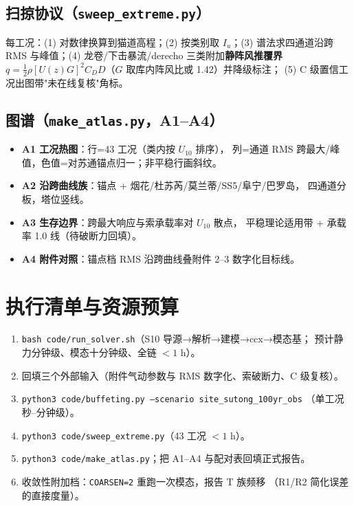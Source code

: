 \documentclass[11pt,a4paper]{ctexart}
\begin{document}
\subsection{扫掠协议（\texttt{sweep\_extreme.py}）}

每工况：(1) 对数律换算到猫道高程；(2) 按类别取 $I_u$；(3) 谱法求四通道沿跨
RMS 与峰值；(4) 龙卷/下击暴流/derecho 三类附加\textbf{静阵风推覆界}
$q=\tfrac12\rho[U(z)G]^2 C_D D$（$G$ 取库内阵风比或 1.42）并降级标注；
(5) C 级置信工况出图带"未在线复核"角标。

\subsection{图谱（\texttt{make\_atlas.py}，A1--A4）}

\begin{itemize}
  \item \textbf{A1 工况热图}：行=43 工况（类内按 $U_{10}$ 排序），
        列=通道 RMS 跨最大/峰值，色值=对苏通锚点归一；非平稳行画斜纹。
  \item \textbf{A2 沿跨曲线族}：锚点 + 烟花/杜苏芮/莫兰蒂/SS5/阜宁/巴罗岛，
        四通道分板，塔位竖线。
  \item \textbf{A3 生存边界}：跨最大响应与索承载率对 $U_{10}$ 散点，
        平稳理论适用带 + 承载率 1.0 线（待破断力回填）。
  \item \textbf{A4 附件对照}：锚点档 RMS 沿跨曲线叠附件 2--3 数字化目标线。
\end{itemize}

\section{执行清单与资源预算}

\begin{enumerate}
  \item \texttt{bash code/run\_solver.sh}（S10 导源→解析→建模→ccx→模态基；
        预计静力分钟级、模态十分钟级、全链 $<1$ h）。
  \item 回填三个外部输入（附件气动参数与 RMS 数字化、索破断力、C 级复核）。
  \item \texttt{python3 code/buffeting.py --scenario site\_sutong\_100yr\_obs}
        （单工况秒--分钟级）。
  \item \texttt{python3 code/sweep\_extreme.py}（43 工况 $<1$ h）。
  \item \texttt{python3 code/make\_atlas.py}；把 A1--A4 与配对表回填正式报告。
  \item 收敛性附加档：\texttt{COARSEN=2} 重跑一次模态，报告 T 族频移
        （R1/R2 简化误差的直接度量）。
\end{enumerate}
\end{document}
